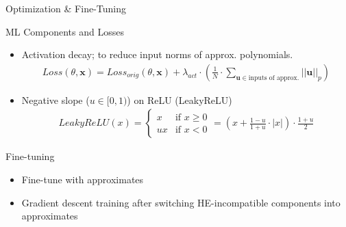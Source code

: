 \documentclass[9pt]{beamer}
\renewcommand{\vec}{\mathbf}
\begin{document}
\begin{frame}{Optimization \& Fine-Tuning}
    \begin{block}{ML Components and Losses}
        \begin{itemize}
            \item \alert{Activation decay;} to reduce input norms of approx. polynomials.
                  \begin{gather*}
                      Loss(\theta, \vec x) = Loss_{orig}(\theta, \vec x) + \lambda_{act} \cdot
                      \left( \frac{1}{N} \cdot \sum_{\vec u \in \text{inputs of approx.}} ||\vec u||_p \right)
                  \end{gather*}
            \item Negative slope ($u \in [0, 1)$) on ReLU (LeakyReLU)
                  \begin{gather*}
                      LeakyReLU(x) = \left\{ \begin{array}{ll}
                          x  & \text{if $x \geq 0$} \\
                          ux & \text{if $x < 0$}
                      \end{array} \right. = \left( x + \frac{1-u}{1+u}\cdot |x| \right) \cdot \frac{1+u}{2}
                  \end{gather*}
        \end{itemize}
    \end{block}
    \begin{block}{Fine-tuning}
        \begin{itemize}
            \item Fine-tune with approximates
            \item Gradient descent training after switching HE-incompatible components into approximates
        \end{itemize}
    \end{block}
\end{frame}
\end{document}
